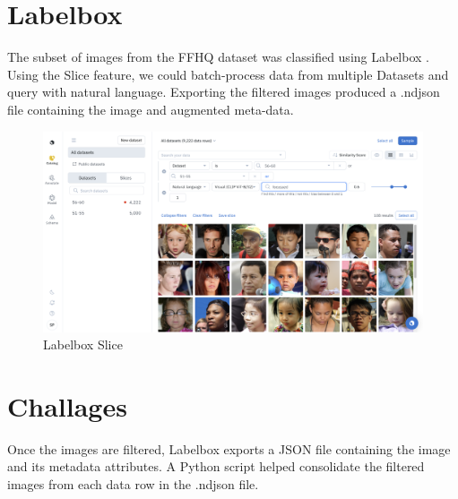 \section{Labelbox}
\noindent The subset of images from the FFHQ \cite{FFHQ} dataset was classified using Labelbox \cite{Labelbox}. Using the Slice \cite{LabelboxSlice} feature, we could batch-process data from multiple Datasets \cite{LabelboxDataset} and query with natural language. Exporting the filtered images produced a .ndjson file containing the image and augmented meta-data.\\
\begin{figure}[h!]
    \centering
    \includegraphics[width=\textwidth]{resources/labelbox.png}
    \caption{Labelbox \cite{Labelbox} Slice \cite{LabelboxSlice}}
\end{figure}


\section{Challages}

\noindent Once the images are filtered, Labelbox \cite{Labelbox} exports a JSON file containing the image and its metadata attributes. A Python script helped consolidate the filtered images from each data row in the .ndjson file.\\


